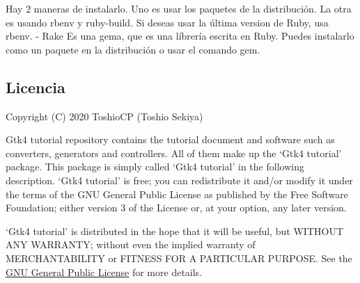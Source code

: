 Hay 2 maneras de instalarlo. Uno es usar los paquetes de la
distribución. La otra es usando rbenv y ruby-build. Si deseas usar la
última version de Ruby, usa rbenv. - Rake Es una gema, que es una
líbrería escrita en Ruby. Puedes instalarlo como un paquete en la
distribución o usar el comando gem.

\hypertarget{licencia}{%
\subsection{Licencia}\label{licencia}}

Copyright (C) 2020 ToshioCP (Toshio Sekiya)

Gtk4 tutorial repository contains the tutorial document and software
such as converters, generators and controllers. All of them make up the
`Gtk4 tutorial' package. This package is simply called `Gtk4 tutorial'
in the following description. `Gtk4 tutorial' is free; you can
redistribute it and/or modify it under the terms of the GNU General
Public License as published by the Free Software Foundation; either
version 3 of the License or, at your option, any later version.

`Gtk4 tutorial' is distributed in the hope that it will be useful, but
WITHOUT ANY WARRANTY; without even the implied warranty of
MERCHANTABILITY or FITNESS FOR A PARTICULAR PURPOSE. See the
\href{https://www.gnu.org/licenses/gpl-3.0.html}{GNU General Public
License} for more details.
